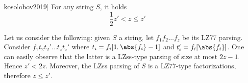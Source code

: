 \documentclass{subfiles}
\begin{document}
    \begin{lemma*}[\cite[Lemma 3]{kosolobov2019}]
        For any string \(S\), it holds 
        \[
            \frac{1}{2}z' < z \le z'
        \]
    \end{lemma*}

    \begin{proof*}
        Let us consider the following: given \(S\) a string, let \(f_{1}f_{2}\ldots f_{z}\)
        be its LZ77 parsing. Consider \(f_{1}t_{2}t_{2}'\ldots t_{z}t_{z}'\) where 
        \(t_{i} = f_{i}[1, \abs{f_{i}} - 1]\) and \(t_{i}' = f_{i}[\abs{f_{i}}]\).
        One can easily observe that the latter is a LZss-type parsing of size at most \(2z - 1\).
        Hence \(z' < 2z\). Moreover, the LZss parsing of \(S\) is a LZ77-type factorizations,
        therefore \(z \le z'\).             
    \end{proof*}
\end{document}
